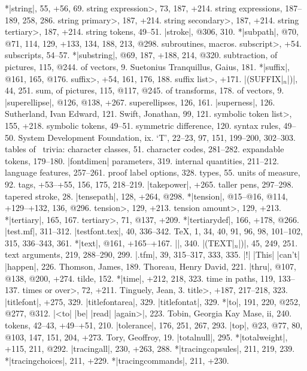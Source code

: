 *|string|, 55, +56, 69.
\<string expression>, 73, 187, +214.
string expressions, 187--189, 258, 286.
\<string primary>, 187, +214.
\<string secondary>, 187, +214.
\<string tertiary>, 187, +214.
string tokens, 49--51.
|stroke|, @306, 310.
*|subpath|, @70, @71, 114, 129, +133, 134, 188, 213, @298.
subroutines, \see macros.
\<subscript>, +54.
subscripts, 54--57.
*|substring|, @69, 187, +188, 214, @320.
subtraction, of pictures, 115, @244.
\sub of vectors, 9.
Suetonius Tranquillus, Gaius, 181.
*|suffix|, @161, 165, @176.
\<suffix>, +54, 161, 176, 188.
\<suffix list>, +171.
|(SUFFIX|$_n$|)|, 44, 251.
sum, of pictures, 115, @117, @245.
\sub of transforms, 178.
\sub of vectors, 9.
|superellipse|, @126, @138, +267.
superellipses, 126, 161.
|superness|, 126.
Sutherland, Ivan Edward, 121.
Swift, Jonathan, 99, 121.
\<symbolic token list>, 155, +218.
symbolic tokens, 49--51.
symmetric difference, 120.
syntax rules, 49--50.
System Development Foundation, ix.
\newletter
`T', 22--23, 97, 151, 199--200, 302--303.
tables of \MF\ trivia:
\sub character classes, 51.
\sub character codes, 281--282.
\sub expandable tokens, 179--180.
\sub |fontdimen| parameters, 319.
\sub internal quantities, 211--212.
\sub language features, 257--261.
\sub proof\/ label options, 328.
\sub types, 55.
\sub units of measure, 92.
tags, +53--+55, 156, 175, 218--219.
|takepower|, +265.
taller pens, 297--298.
tapered stroke, 28.
|tensepath|, 128, +264, @298.
*|tension|, @15--@16, @114, +129--+132, 136, @296.
\<tension>, 129, +213.
\<tension amount>, 129, +213.
*|tertiary|, 165, 167.
\<tertiary>, 71, @137, +209.
*|tertiarydef|, 166, +178, @266.
|test.mf|, 311--312.
|testfont.tex|, 40, 336--342.
\TeX, 1, 34, 40, 91, 96, 98, 101--102, 315, 336--343, 361.
*|text|, @161, +165--+167.
|\text|, 340.
|(TEXT|$_n$|)|, 45, 249, 251.
text arguments, 219, 288--290, 299.
|.tfm|, 39, 315--317, 333, 335.
|!| |This| |can't| |happen|, 226.
Thomson, James, 189.
Thoreau, Henry David, 221.
|thru|, @107, @138, @200, +274.
tilde, 152.
*|time|, +212, 218, 323.
time in paths, 119, 133--137.
\<times or over>, 72, +211.
Tinguely, Jean, 3.
\<title>, +187, 217--218, 323.
|titlefont|, +275, 329.
|titlefontarea|, 329.
|titlefontat|, 329.
*|to|, 191, 220, @252, @277, @312.
|<to| |be| |read| |again>|, 223.
Tobin, Georgia Kay Mase, ii, 240.
tokens, 42--43, +49--+51, 210.
|tolerance|, 176, 251, 267, 293.
|top|, @23, @77, 80, @103, 147, 151, 204, +273.
Tory, Geoffroy, 19.
|totalnull|, 295.
*|totalweight|, +115, 211, @292.
|tracingall|, 230, +263, 288.
*|tracingcapsules|, 211, 219, 239.
*|tracingchoices|, 211, +229.
*|tracingcommands|, 211, +230.
